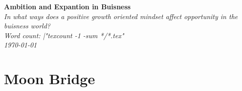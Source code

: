 \documentclass[letterpaper, 12pt]{article}
\author{Grant Lemons}
\date{\today}
\newcommand{\thetitle}{Ambition and Expantion in Buisness}
\newcommand{\researchquestion}{In what ways does a positive growth oriented mindset affect opportunity in the buisness world?}
\newcommand{\wordcount}{|"texcount -1 -sum */*.tex"}
\begin{document}
\begin{titlepage}
\begin{center}
\vspace*{6.3cm}
\textbf{\Huge \thetitle}\\
\textit{\researchquestion}\\
\vspace{2.5cm}
\textit{Word count: \wordcount}\\
\vspace{0.6cm}
\textit{\today}\\

\end{center}
\end{titlepage}


\newpage

\section{Moon Bridge}

\end{document}
